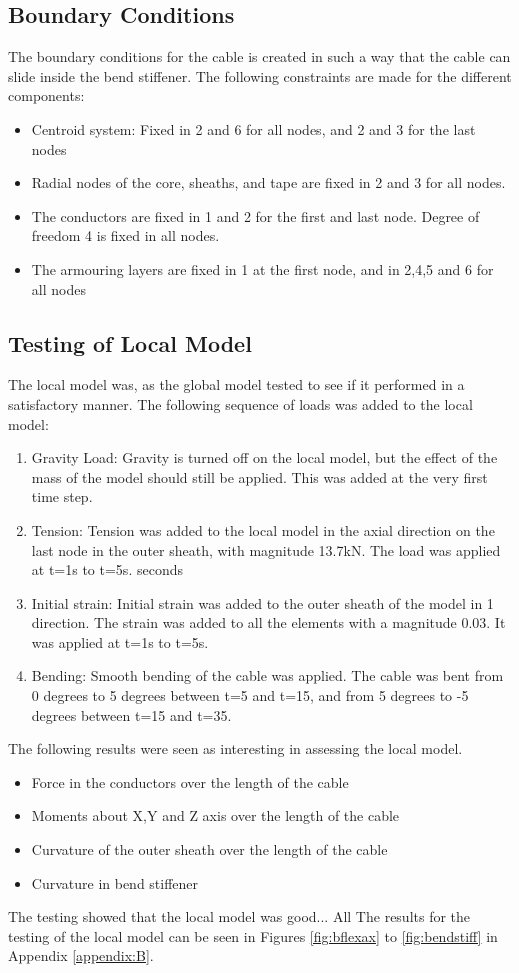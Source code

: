 \subsection{Boundary Conditions}
The boundary conditions for the cable is created in such a way that the cable can slide inside the bend stiffener. The following constraints are made for the different components:
\begin{itemize}
    \item Centroid system: Fixed in 2 and 6 for all nodes, and 2 and 3 for the last nodes
    \item Radial nodes of the core, sheaths, and tape are fixed in 2 and 3 for all nodes. 
    \item The conductors are fixed in 1 and 2 for the first and last node. Degree of freedom 4 is fixed in all nodes.
    \item The armouring layers are fixed in 1 at the first node, and in 2,4,5 and 6 for all nodes
\end{itemize}

\subsection{Testing of Local Model}
\label{sec:localtest}
The local model was, as the global model tested to see if it performed in a satisfactory manner.
 \noindent The following sequence of loads was added to the local model:
\begin{enumerate}
    \item Gravity Load: Gravity is turned off on the local model, but the effect of the mass of the model should still be applied. This was added at the very first time step.
    \item Tension: Tension was added to the local model in the axial direction on the last node in the outer sheath, with magnitude 13.7kN. The load was applied at t=1s to t=5s. seconds
    \item Initial strain: Initial strain was added to the outer sheath of the model in 1 direction. The strain was added to all the elements with a magnitude 0.03. It was applied at t=1s to t=5s.
    \item Bending: Smooth bending of the cable was applied. The cable was bent from 0 degrees to 5 degrees between t=5 and t=15, and from 5 degrees to -5 degrees between t=15 and t=35.  
\end{enumerate}
The following results were seen as interesting in assessing the local model. 
\begin{itemize}
    \item Force in the conductors over the length of the cable
    \item Moments about X,Y and Z axis over the length of the cable
    \item Curvature of the outer sheath over the length of the cable
    \item Curvature in bend stiffener
\end{itemize}
The testing showed that the local model was good...  All  The results for the testing of the local model can be seen in Figures \ref{fig:bflexax} to \ref{fig:bendstiff} in Appendix \ref{appendix:B}.

